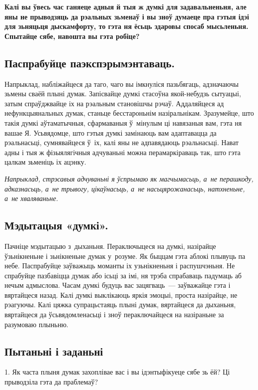 \textbf{Калі вы ўвесь час ганяеце адныя й тыя ж думкі для задавальненьня, але яны не прыводзяць да рэальных зьменаў і вы зноў думаеце пра гэтыя ідэі для зьняцьця дыскамфорту, то гэта ня ёсьць здаровы спосаб мысьленьня. Спытайце сябе, навошта вы гэта робіце?}

\subsection*{Паспрабуйце паэкспэрымэнтаваць.}

Напрыклад, набліжайцеся да таго, чаго вы імкнуліся пазьбягаць, адзначаючы зьмены сваёй плыні думак. Запісвайце думкі стасоўна якой-небудзь сытуацыі, затым спраўджвайце іх на рэальным становішчы рэчаў. Аддаляйцеся ад нефункцыянальных думак, станьце бесстароньнім назіральнікам. Зразумейце, што такія думкі аўтаматычныя, сфармаваныя ў~мінулым ці навязаныя вам, гэта ня вашае Я. Усьвядомце, што гэтыя думкі замінаюць вам адаптавацца да рэальнасьці, сумнявайцеся ў~іх, калі яны не адпавядаюць рэальнасьці. Нават адны і тыя ж фізыялягічныя адчуваньні можна перамаркіраваць так, што гэта цалкам зьменіць іх ацэнку.

\emph{Напрыклад, стрэсавыя адчуваньні я ўспрымаю як магчымасьць, а~не перашкоду, адказнасьць, а~не трывогу, цікаўнасьць, а~не насьцярожанасьць, натхненьне, а~не хваляваньне.}

\subsection*{Мэдытацыя «думкі».}

Пачніце мэдытацыю з~дыханьня. Пераключыцеся на думкі, назірайце ўзьнікненьне і зьнікненьне думак у~розуме. Як быццам гэта аблокі плывуць па небе. Паспрабуйце заўважыць моманты іх узьнікненьня і распушчэньня. Не спрабуйце пазбавіцца думак або ісьці за імі, ня трэба спрабаваць падумаць аб нечым адмыслова. Часам думкі будуць вас зацягваць~--- заўважайце гэта і вяртайцеся назад. Калі думкі выклікаюць яркія эмоцыі, проста назірайце, не рэагуючы. Калі цяжка супрацьстаяць плыні думак, вяртайцеся да дыханьня, вяртайцеся да ўсьвядомленасьці і зноў пераключайцеся на назіраньне за разумоваю плыньню.

\subsection*{Пытаньні і заданьні}

1. Як часта плыня думак захоплівае вас і вы ідэнтыфікуеце сябе зь ёй? Ці прыводзіла гэта да праблемаў?

